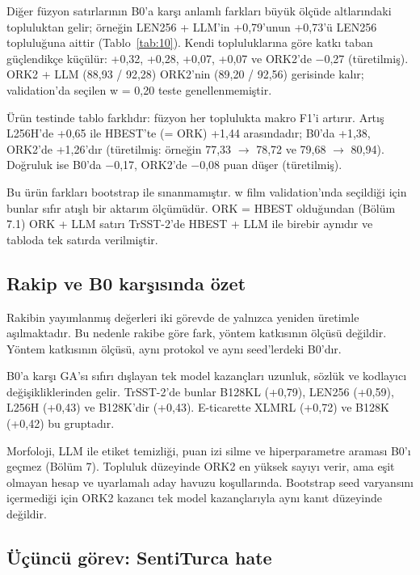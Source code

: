 \documentclass[11pt]{article}
\begin{document}
Diğer füzyon satırlarının B0'a karşı anlamlı farkları büyük ölçüde altlarındaki topluluktan gelir; örneğin LEN256 + LLM'in +0,79'unun +0,73'ü LEN256 topluluğuna aittir (Tablo~\ref{tab:10}). Kendi topluluklarına göre katkı taban güçlendikçe küçülür: +0,32, +0,28, +0,07, +0,07 ve ORK2'de $-$0,27 (türetilmiş). ORK2 + LLM (88,93 / 92,28) ORK2'nin (89,20 / 92,56) gerisinde kalır; validation'da seçilen w = 0,20 teste genellenmemiştir.

Ürün testinde tablo farklıdır: füzyon her toplulukta makro F1'i artırır. Artış L256H'de +0,65 ile HBEST'te (= ORK) +1,44 arasındadır; B0'da +1,38, ORK2'de +1,26'dır (türetilmiş: örneğin 77,33 $\rightarrow$ 78,72 ve 79,68 $\rightarrow$ 80,94). Doğruluk ise B0'da $-$0,17, ORK2'de $-$0,08 puan düşer (türetilmiş).

Bu ürün farkları bootstrap ile sınanmamıştır. w film validation'ında seçildiği için bunlar sıfır atışlı bir aktarım ölçümüdür. ORK = HBEST olduğundan (Bölüm 7.1) ORK + LLM satırı TrSST-2'de HBEST + LLM ile birebir aynıdır ve tabloda tek satırda verilmiştir.

\subsection{Rakip ve B0 karşısında özet}

Rakibin yayımlanmış değerleri iki görevde de yalnızca yeniden üretimle aşılmaktadır. Bu nedenle rakibe göre fark, yöntem katkısının ölçüsü değildir. Yöntem katkısının ölçüsü, aynı protokol ve aynı seed'lerdeki B0'dır.

B0'a karşı GA'sı sıfırı dışlayan tek model kazançları uzunluk, sözlük ve kodlayıcı değişikliklerinden gelir. TrSST-2'de bunlar B128KL (+0,79), LEN256 (+0,59), L256H (+0,43) ve B128K'dir (+0,43). E-ticarette XLMRL (+0,72) ve B128K (+0,42) bu gruptadır.

Morfoloji, LLM ile etiket temizliği, puan izi silme ve hiperparametre araması B0'ı geçmez (Bölüm 7). Topluluk düzeyinde ORK2 en yüksek sayıyı verir, ama eşit olmayan hesap ve uyarlamalı aday havuzu koşullarında. Bootstrap seed varyansını içermediği için ORK2 kazancı tek model kazançlarıyla aynı kanıt düzeyinde değildir.

\subsection{Üçüncü görev: SentiTurca hate}
\end{document}
